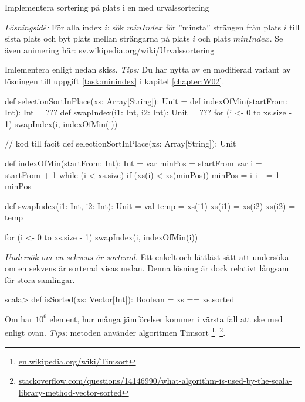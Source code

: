 \Task Implementera sortering på plats  i en  med urvalssortering  

\emph{Lösningsidé:} För alla index $i$: sök $minIndex$ för ''minsta'' strängen från plats $i$ till sista plats och byt plats mellan strängarna på plats $i$ och plats $minIndex$. Se även animering här: \href{https://sv.wikipedia.org/wiki/Urvalssortering}{sv.wikipedia.org/wiki/Urvalssortering}

Imlementera enligt nedan skiss.  \emph{Tips:} Du har nytta av en modifierad variant av lösningen till uppgift \ref{task:minindex} i kapitel \ref{chapter:W02}.
\begin{Code}
def selectionSortInPlace(xs: Array[String]): Unit = {
  def indexOfMin(startFrom: Int): Int = ??? 
  def swapIndex(i1: Int, i2: Int): Unit = ???
  for (i <- 0 to xs.size - 1) swapIndex(i, indexOfMin(i))
}
\end{Code} 

\begin{Code}
// kod till facit
def selectionSortInPlace(xs: Array[String]): Unit = {
  
  def indexOfMin(startFrom: Int): Int = {
    var minPos = startFrom
    var i = startFrom + 1
    while (i < xs.size) {
      if (xs(i) < xs(minPos)) minPos = i
      i += 1
    }
    minPos
  }
  
  def swapIndex(i1: Int, i2: Int): Unit = {
    val temp = xs(i1)
    xs(i1) = xs(i2)
    xs(i2) = temp
  }
  
  for (i <- 0 to xs.size - 1) swapIndex(i, indexOfMin(i))
}

\end{Code}


\ExtraTasks %

\Task \label{task:isSorted} \emph{Undersök om en sekvens är sorterad.} Ett enkelt och lättläst sätt att undersöka om en sekvens är sorterad visas nedan. Denna lösning är dock relativt långsam för stora samlingar.
\begin{REPL}
scala> def isSorted(xs: Vector[Int]): Boolean = xs == xs.sorted
\end{REPL}
\Subtask\Pen  Om  har $10^6$ element, hur många jämförelser kommer i värsta fall att ske med  enligt ovan. \emph{Tips:} metoden  använder algoritmen Timsort%
\footnote{\href{https://en.wikipedia.org/wiki/Timsort}{en.wikipedia.org/wiki/Timsort}}\textsuperscript{, }\footnote{\href{http://stackoverflow.com/questions/14146990/what-algorithm-is-used-by-the-scala-library-method-vector-sorted}{stackoverflow.com/questions/14146990/what-algorithm-is-used-by-the-scala-library-method-vector-sorted}}.


